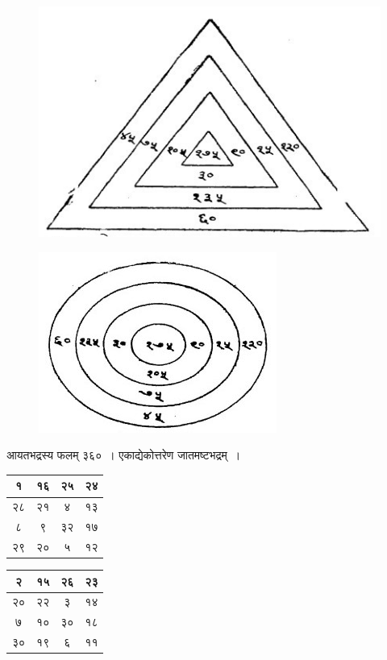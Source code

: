 \documentclass[11pt, openany]{book}
\begin{document}
\begin{figure}[h!]
    \centering
    \includegraphics[scale=0.5]{graphics/424_1.jpg}
    
\end{figure}

\begin{figure}[h!]
    \centering
    \includegraphics[scale=0.5]{graphics/424_2.jpg}
    
\end{figure}

\newpage

आयतभद्रस्य फलम् ३६०~। एकाद्येकोत्तरेण जातमष्टभद्रम्~।

\begin{table}[h]
	\centering
\begin{tabular}{|c|c|c|c|}
	\hline
	१& १६ & २५ & २४\\
	\hline	
	२८ & २१ & ४ & १३\\
	\hline
	८ & ९ & ३२  & १७\\
	\hline
	२९ & २० & ५ & १२\\
	\hline
\end{tabular} \hspace{4mm} 
\begin{tabular}{|c|c|c|c|}
	\hline
	२& १५ & २६ & २३\\
	\hline	
	२० & २२ & ३ & १४\\
	\hline
	७ & १० & ३०  & १८\\
	\hline
	३० & १९ & ६ & ११\\
	\hline
\end{tabular}

\end{table}
\end{document}
